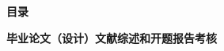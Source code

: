 \documentclass[UTF8,a4paper,twoside]{article}
\numberwithin{equation}{subsection} %
\numberwithin{figure}{subsection} %
\numberwithin{table}{subsection}  %
\begin{document}
    
    \newpage
    \pagestyle{Require}
    
	
    \newpage
    \pagestyle{Index}
    \begin{center}
         \bfseries 目录
    \end{center}
    \tableofcontents
    \noindent {}\bfseries \hspace{0.36em}毕业论文（设计）文献综述和开题报告考核
    \newpage 
	\ \\ 
    \newpage
    
    
    
    

    \newpage
    
	
			
\end{document}
